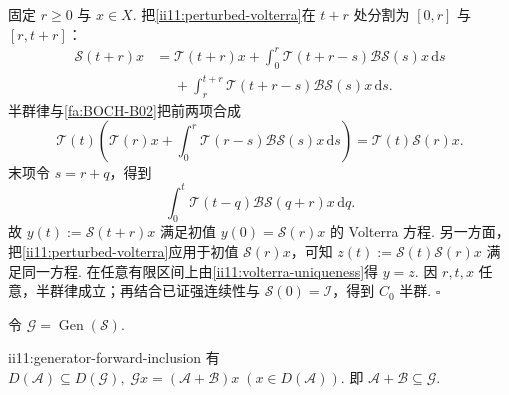 \begin{FAProof}
固定 \(\displaystyle r\geqslant0\) 与 \(\displaystyle x\in X\). 把\autoref{ii11:perturbed-volterra}在 \(\displaystyle t+r\) 处分割为 \(\displaystyle[0,r]\) 与 \(\displaystyle[r,t+r]\)：
\[
\begin{aligned}
\mathcal S(t+r)x
&=
\mathcal T(t+r)x
+
\int_0^r\mathcal T(t+r-s)\mathcal B\mathcal S(s)x\,\mathrm{d}s\\
&\mathrel{\phantom{=}}+
\int_r^{t+r}\mathcal T(t+r-s)\mathcal B\mathcal S(s)x\,\mathrm{d}s.
\end{aligned}
\]
半群律与\autoref{fa:BOCH-B02}把前两项合成
\[
\mathcal T(t)
\left(
\mathcal T(r)x+
\int_0^r\mathcal T(r-s)\mathcal B\mathcal S(s)x\,\mathrm{d}s
\right)
=
\mathcal T(t)\mathcal S(r)x.
\]
末项令 \(\displaystyle s=r+q\)，得到
\[
\int_0^t
\mathcal T(t-q)\mathcal B\mathcal S(q+r)x
\,\mathrm{d}q.
\]
故 \(\displaystyle y(t):=\mathcal S(t+r)x\) 满足初值 \(\displaystyle y(0)=\mathcal S(r)x\) 的 Volterra 方程. 另一方面，把\autoref{ii11:perturbed-volterra}应用于初值 \(\displaystyle\mathcal S(r)x\)，可知 \(\displaystyle z(t):=\mathcal S(t)\mathcal S(r)x\) 满足同一方程. 在任意有限区间上由\autoref{ii11:volterra-uniqueness}得 \(\displaystyle y=z\). 因 \(\displaystyle r,t,x\) 任意，半群律成立；再结合已证强连续性与 \(\displaystyle\mathcal S(0)=\mathcal I\)，得到 \(\displaystyle C_0\) 半群.
\hfill\(\square\)
\end{FAProof}

令 \(\displaystyle\mathcal G=\operatorname{Gen}(\mathcal S)\).

\begin{FAProposition}[B][扰动生成元的正向包含]{ii11:generator-forward-inclusion}
有 \(\displaystyle D(\mathcal A)\subseteq D(\mathcal G), \; \mathcal Gx=(\mathcal A+\mathcal B)x \; (x\in D(\mathcal A)).\)
即 \(\displaystyle\mathcal A+\mathcal B\subseteq\mathcal G\).
\end{FAProposition}

